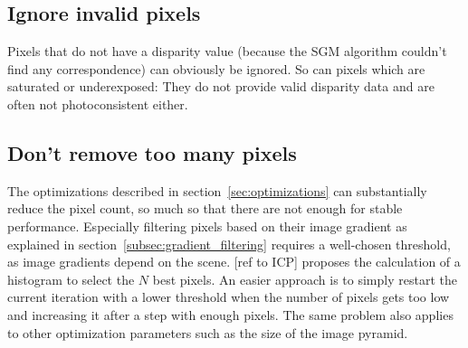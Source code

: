\subsection{Ignore invalid pixels}

Pixels that do not have a disparity value (because the SGM algorithm couldn't
find any correspondence) can obviously be ignored. So can pixels which are
saturated or underexposed: They do not provide valid disparity data and are
often not photoconsistent either.

\subsection{Don't remove too many pixels}

The optimizations described in section~\ref{sec:optimizations} can
substantially reduce the pixel count, so much so that there are not enough for
stable performance. Especially filtering pixels based on their image gradient
as explained in section~\ref{subsec:gradient_filtering} requires a well-chosen
threshold, as image gradients depend on the scene. [ref to ICP] proposes the
calculation of a histogram to select the $N$ best pixels. An easier approach is
to simply restart the current iteration with a lower threshold when the number
of pixels gets too low and increasing it after a step with enough pixels. The
same problem also applies to other optimization parameters such as the size of
the image pyramid.
